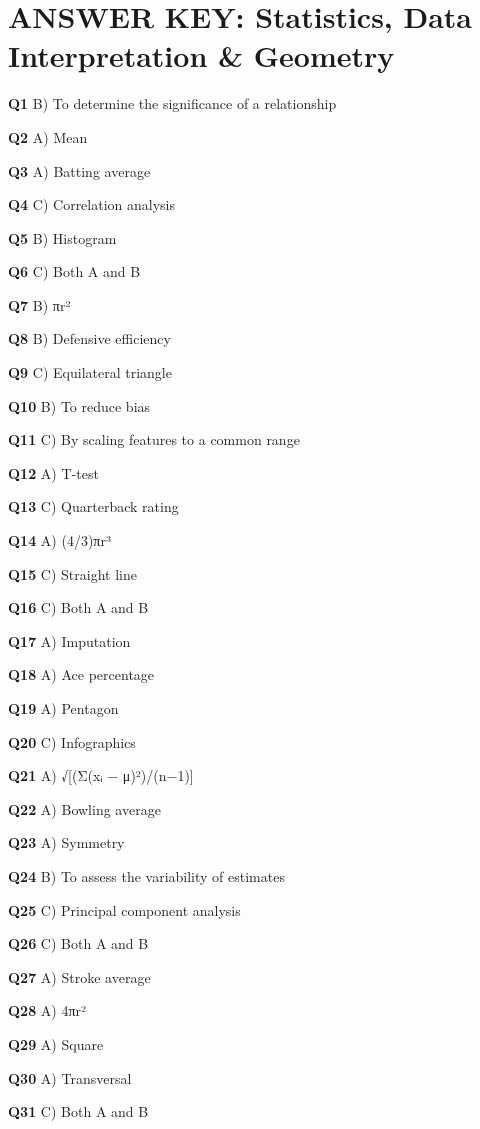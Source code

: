 \section{ANSWER KEY: Statistics, Data Interpretation & Geometry}

\textbf{Q1} B) To determine the significance of a relationship\par
\textbf{Q2} A) Mean\par
\textbf{Q3} A) Batting average\par
\textbf{Q4} C) Correlation analysis\par
\textbf{Q5} B) Histogram\par
\textbf{Q6} C) Both A and B\par
\textbf{Q7} B) πr²\par
\textbf{Q8} B) Defensive efficiency\par
\textbf{Q9} C) Equilateral triangle\par
\textbf{Q10} B) To reduce bias\par
\textbf{Q11} C) By scaling features to a common range\par
\textbf{Q12} A) T‑test\par
\textbf{Q13} C) Quarterback rating\par
\textbf{Q14} A) (4/3)πr³\par
\textbf{Q15} C) Straight line\par
\textbf{Q16} C) Both A and B\par
\textbf{Q17} A) Imputation\par
\textbf{Q18} A) Ace percentage\par
\textbf{Q19} A) Pentagon\par
\textbf{Q20} C) Infographics\par
\textbf{Q21} A) √[(Σ(xᵢ − μ)²)/(n−1)]\par
\textbf{Q22} A) Bowling average\par
\textbf{Q23} A) Symmetry\par
\textbf{Q24} B) To assess the variability of estimates\par
\textbf{Q25} C) Principal component analysis\par
\textbf{Q26} C) Both A and B\par
\textbf{Q27} A) Stroke average\par
\textbf{Q28} A) 4πr²\par
\textbf{Q29} A) Square\par
\textbf{Q30} A) Transversal\par
\textbf{Q31} C) Both A and B\par
